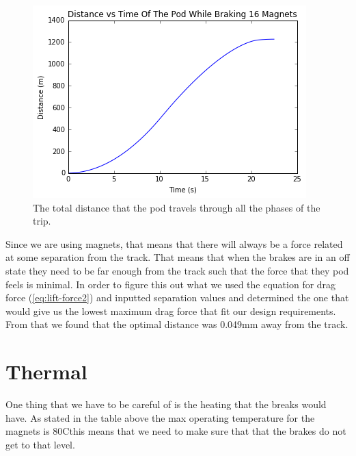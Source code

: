 \documentclass[main.tex]{subfiles}
\begin{document}
    \begin{figure}[H]
        \centering
        \includegraphics[width=\linewidth]{images/totaldistanceprofile}
        \caption{The total distance that the pod travels through all the phases of the trip.}
        \label{fig:distance-profile}
    \end{figure}
    
    Since we are using magnets, that means that there will always be a force related at some separation from the track. That means that when the brakes are in an off state they need to be far enough from the track such that the force that they pod feels is minimal. In order to figure this out what we used the equation for drag force (\ref{eq:lift-force2}) and inputted separation values and determined the one that would give us the lowest maximum drag force that fit our design requirements. From that we found that the optimal distance was 0.049mm away from the track.    
    
    \section{Thermal}
    One thing that we have to be careful of is the heating that the breaks would have. As stated in the table above the max operating temperature for the magnets is $80$C\textdegree this means that we need to make sure that that the brakes do not get to that level.\\
\end{document}
